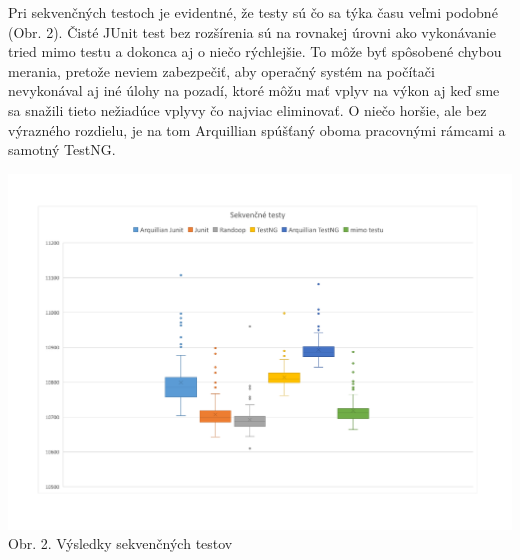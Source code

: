 \documentclass[11pt,twoside,slovak,a4paper]{article}
\begin{document}
	Pri sekvenčných testoch je evidentné, že testy sú čo sa týka času veľmi podobné (Obr. 2). Čisté JUnit test bez rozšírenia sú na rovnakej úrovni ako vykonávanie tried mimo testu a dokonca aj o niečo rýchlejšie. To môže byť spôsobené chybou merania, pretože neviem zabezpečiť, aby operačný systém na počítači nevykonával aj iné úlohy na pozadí, ktoré môžu mať vplyv na výkon aj keď sme sa snažili tieto nežiadúce vplyvy čo najviac eliminovať. O niečo horšie, ale bez výrazného rozdielu, je na tom Arquillian spúšťaný oboma pracovnými rámcami a samotný TestNG.
	
	\begin{center}
		\hspace*{-1.8cm} 
		\includegraphics[width = 500pt, trim = 0pt 50pt 0pt 50pt]{graf_sekvencne}
		\newline
		\tiny Obr. 2. Výsledky sekvenčných testov
	\end{center}
	
\end{document}
